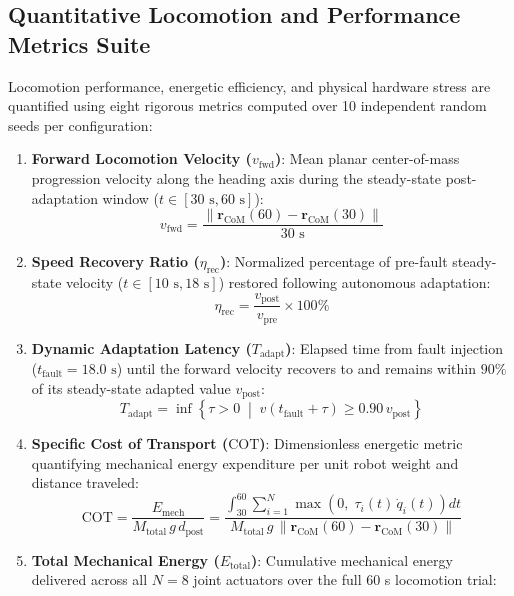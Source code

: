 \documentclass{iopjournal}
\begin{document}
\subsection{Quantitative Locomotion and Performance Metrics Suite}

Locomotion performance, energetic efficiency, and physical hardware stress are quantified using eight rigorous metrics computed over 10 independent random seeds per configuration:
\begin{enumerate}
\item \textbf{Forward Locomotion Velocity ($v_{\text{fwd}}$)}: Mean planar center-of-mass progression velocity along the heading axis during the steady-state post-adaptation window ($t \in [30\text{ s}, 60\text{ s}]$):
\begin{equation}
v_{\text{fwd}} = \frac{\|\mathbf{r}_{\text{CoM}}(60) - \mathbf{r}_{\text{CoM}}(30)\|}{30\text{ s}}
\end{equation}
\item \textbf{Speed Recovery Ratio ($\eta_{\text{rec}}$)}: Normalized percentage of pre-fault steady-state velocity ($t \in [10\text{ s}, 18\text{ s}]$) restored following autonomous adaptation:
\begin{equation}
\eta_{\text{rec}} = \frac{v_{\text{post}}}{v_{\text{pre}}} \times 100\%
\end{equation}
\item \textbf{Dynamic Adaptation Latency ($T_{\text{adapt}}$)}: Elapsed time from fault injection ($t_{\text{fault}} = 18.0\text{ s}$) until the forward velocity recovers to and remains within $90\%$ of its steady-state adapted value $v_{\text{post}}$:
\begin{equation}
T_{\text{adapt}} = \inf \left\{ \tau > 0 \;\middle|\; v(t_{\text{fault}} + \tau) \ge 0.90\, v_{\text{post}} \right\}
\end{equation}
\item \textbf{Specific Cost of Transport ($\text{COT}$)}: Dimensionless energetic metric quantifying mechanical energy expenditure per unit robot weight and distance traveled:
\begin{equation}
\text{COT} = \frac{E_{\text{mech}}}{M_{\text{total}}\, g\, d_{\text{post}}} = \frac{\int_{30}^{60} \sum_{i=1}^N \max\!\left(0,\; \tau_i(t)\, \dot{q}_i(t)\right) dt}{M_{\text{total}}\, g\, \|\mathbf{r}_{\text{CoM}}(60) - \mathbf{r}_{\text{CoM}}(30)\|}
\end{equation}
\item \textbf{Total Mechanical Energy ($E_{\text{total}}$)}: Cumulative mechanical energy delivered across all $N=8$ joint actuators over the full 60 s locomotion trial:

\end{enumerate}
\end{document}
